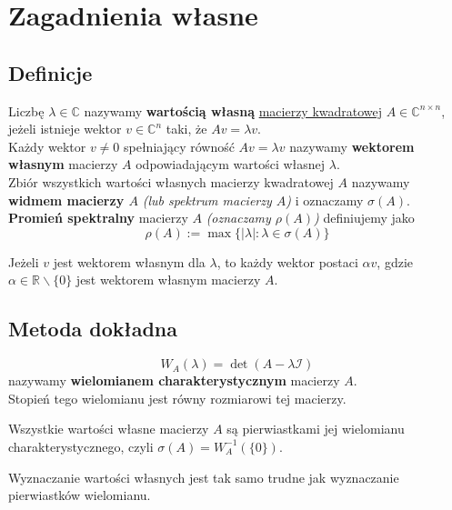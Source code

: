\documentclass[../mn-notatki.tex]{subfiles}
\begin{document}
\section{Zagadnienia własne}

\subsection{Definicje}
\begin{tcolorbox}
Liczbę $\lambda \in \mathbb{C}$ nazywamy \textbf{wartością własną}
\underline{macierzy kwadratowej} $A \in \mathbb{C}^{n\times n}$, jeżeli
istnieje wektor $v \in \mathbb{C}^n$ taki, że $Av = \lambda v$.\\

Każdy wektor $v \neq 0$ spełniający równość $Av = \lambda v$ nazywamy
\textbf{wektorem własnym} macierzy $A$ odpowiadającym wartości własnej
$\lambda$.\\

Zbiór wszystkich wartości własnych macierzy kwadratowej $A$ nazywamy
\textbf{widmem macierzy $A$} \textit{(lub spektrum macierzy $A$)}
i oznaczamy $\sigma(A)$.\\

\textbf{Promień spektralny} macierzy $A$ \textit{(oznaczamy $\rho(A)$)}
definiujemy jako
\[
\rho(A) := \max\{ |\lambda| : \lambda \in \sigma(A) \}
\]
\end{tcolorbox}
\begin{tcolorbox}
Jeżeli $v$ jest wektorem własnym dla $\lambda$, to każdy wektor postaci
$\alpha v$, gdzie $\alpha \in \mathbb{R} \backslash \{0\}$ jest wektorem
własnym macierzy $A$.
\end{tcolorbox}

\subsection{Metoda dokładna}
\begin{tcolorbox}
\[
W_A(\lambda) = \det(A - \lambda \mathcal{I})
\]
nazywamy \textbf{wielomianem charakterystycznym} macierzy $A$.\\
Stopień tego wielomianu jest równy rozmiarowi tej macierzy.
\end{tcolorbox}
\begin{tcolorbox}
Wszystkie wartości własne macierzy $A$ są pierwiastkami jej wielomianu
charakterystycznego, czyli $\sigma(A) = W_A^{-1}\left(\{0\}\right)$.
\end{tcolorbox}
\begin{tcolorbox}
Wyznaczanie wartości własnych jest tak samo trudne jak wyznaczanie pierwiastków
wielomianu.
\end{tcolorbox}
\end{document}
